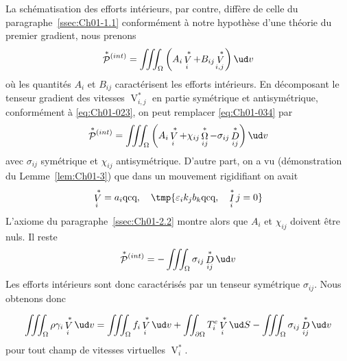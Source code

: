 La schématisation des efforts intérieurs, par contre, diffère de celle du paragraphe~\ref{ssec:Ch01-1.1} conformément à notre hypothèse d'une théorie du premier gradient, nous prenons
\begin{equation}
    \mathop{\mathcal{P}}^{\ast}{\!}^{(int)} = \iiint_{\Omega} \left( A_i \mathop{V}^{\ast}_i + B_{ij} \mathop{V}^{\ast}_{i,j} \right) \ud v
    \label{eq:Ch01-034}
\end{equation}
où les quantités $A_i$ et $B_{ij}$ caractérisent les efforts intérieurs.
En décomposant le tenseur gradient des vitesses $\mathop{V}^{\ast}_{i,j}$ en partie symétrique et antisymétrique, conformément à \eqref{eq:Ch01-023}, on peut remplacer \eqref{eq:Ch01-034} par
\begin{equation}
    \mathop{\mathcal{P}}^{\ast}{\!}^{(int)} = \iiint_{\Omega} \left( A_i \mathop{V}^{\ast}_i + \chi_{ij} \mathop{\Omega}^{\ast}_{ij} - \sigma_{ij} \mathop{D}^{\ast}_{ij} \right) \ud v
    \label{eq:Ch01-035} 
\end{equation}
avec $\sigma_{ij}$ symétrique et $\chi_{ij}$ antisymétrique.
D'autre part, on a vu (démonstration du Lemme~\ref{lem:Ch01-3}) que dans un mouvement rigidifiant on avait
\begin{equation}
    \mathop{V}^{\ast}_i = a_i \text{qcq}, \quad \tmp{\varepsilon_i k_j b_k \text{qcq}, \quad \mathop{I}^{\ast}_ij = 0}
    \label{eq:Ch01-036}
\end{equation}
L'axiome du paragraphe~\ref{ssec:Ch01-2.2} montre alors que $A_i$ et $\chi_{ij}$ doivent être nuls.
Il reste
\begin{equation}
    \mathop{\mathcal{P}}^{\ast}{\!}^{(int)} = -\iiint_{\Omega} \sigma_{ij} \mathop{D}^{\ast}_{ij} \ud v
    \label{eq:Ch01-037}
\end{equation}
Les efforts intérieurs sont donc caractérisés par un tenseur symétrique $\sigma_{ij}$.
Nous obtenons donc 
\begin{Principe}
    \begin{equation}
        \iiint_{\Omega} \rho \gamma_i \mathop{V}^{\ast}_i \ud v = \iiint_{\Omega} f_i \mathop{V}^{\ast}_i \ud v + \iint_{\partial \Omega} T_i^e \mathop{V}^{\ast}_i \ud S - \iiint_{\Omega} \sigma_{ij} \mathop{D}^{\ast}_{ij} \ud v
        \label{eq:Ch01-038}
    \end{equation}
    pour tout champ de vitesses virtuelles $\mathop{V}^{\ast}_i$.
\end{Principe}

